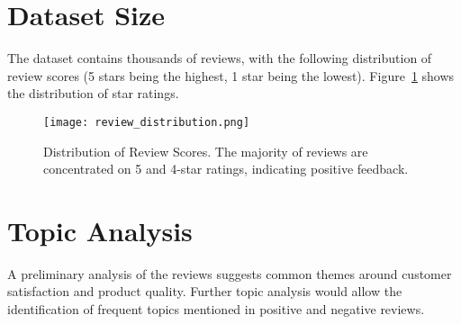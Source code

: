 \documentclass[conference]{IEEEtran}
\begin{document}
\section{Dataset Size}
The dataset contains thousands of reviews, with the following distribution of review scores (5 stars being the highest, 1 star being the lowest). 
Figure~\ref{fig:review_distribution} shows the distribution of star ratings.

\begin{figure}[ht]
\centering
\texttt{[image: review\_distribution.png]}
\caption{Distribution of Review Scores. The majority of reviews are concentrated on 5 and 4-star ratings, indicating positive feedback.}
\label{fig:review_distribution}
\end{figure}

\section{Topic Analysis}
A preliminary analysis of the reviews suggests common themes around customer satisfaction and product quality. 
Further topic analysis would allow the identification of frequent topics mentioned in positive and negative reviews.
\end{document}
